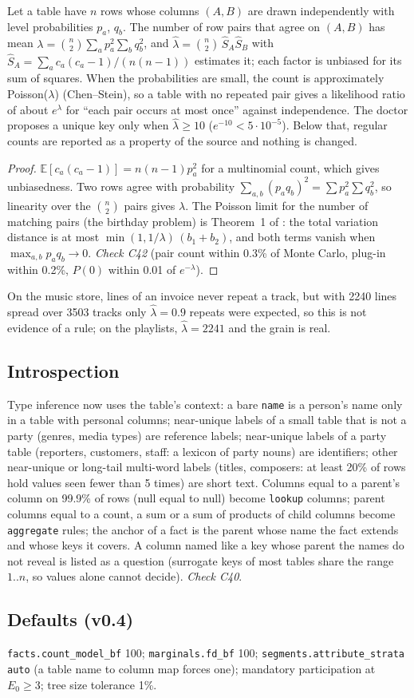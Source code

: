 \begin{proposition}\label{prop:grainev}
Let a table have $n$ rows whose columns $(A,B)$ are drawn independently with level probabilities $p_a$, $q_b$. The number of row pairs that agree on $(A,B)$ has mean $\lambda=\binom n2\sum_a p_a^2\sum_b q_b^2$, and $\hat\lambda=\binom n2\,\hat S_A\hat S_B$ with $\hat S_A=\sum_a c_a(c_a-1)/(n(n-1))$ estimates it; each factor is unbiased for its sum of squares. When the probabilities are small, the count is approximately Poisson($\lambda$) (Chen--Stein), so a table with no repeated pair gives a likelihood ratio of about $e^{\lambda}$ for ``each pair occurs at most once'' against independence. The doctor proposes a unique key only when $\hat\lambda\ge10$ ($e^{-10}<5\cdot10^{-5}$). Below that, regular counts are reported as a property of the source and nothing is changed.
\end{proposition}
\begin{proof}
$\mathbb E[c_a(c_a-1)]=n(n-1)p_a^2$ for a multinomial count, which gives unbiasedness. Two rows agree with probability $\sum_{a,b}(p_aq_b)^2=\sum p_a^2\sum q_b^2$, so linearity over the $\binom n2$ pairs gives $\lambda$. The Poisson limit for the number of matching pairs (the birthday problem) is Theorem~1 of \cite{agg}: the total variation distance is at most $\min(1,1/\lambda)\,(b_1+b_2)$, and both terms vanish when $\max_{a,b}p_aq_b\to0$. \emph{Check C42} (pair count within 0.3\% of Monte Carlo, plug-in within 0.2\%, $P(0)$ within 0.01 of $e^{-\lambda}$).
\end{proof}
On the music store, lines of an invoice never repeat a track, but with 2240 lines spread over 3503 tracks only $\hat\lambda=0.9$ repeats were expected, so this is not evidence of a rule; on the playlists, $\hat\lambda=2241$ and the grain is real.

\subsection{Introspection}
Type inference now uses the table's context: a bare \texttt{name} is a person's name only in a table with personal columns; near-unique labels of a small table that is not a party (genres, media types) are reference labels; near-unique labels of a party table (reporters, customers, staff: a lexicon of party nouns) are identifiers; other near-unique or long-tail multi-word labels (titles, composers: at least 20\% of rows hold values seen fewer than 5 times) are short text. Columns equal to a parent's column on 99.9\% of rows (null equal to null) become \texttt{lookup} columns; parent columns equal to a count, a sum or a sum of products of child columns become \texttt{aggregate} rules; the anchor of a fact is the parent whose name the fact extends and whose keys it covers. A column named like a key whose parent the names do not reveal is listed as a question (surrogate keys of most tables share the range $1..n$, so values alone cannot decide). \emph{Check C40}.

\subsection{Defaults (v0.4)}
\texttt{facts.count\_model\_bf} 100; \texttt{marginals.fd\_bf} 100; \texttt{segments.attribute\_strata} \texttt{auto} (a table name to column map forces one); mandatory participation at $E_0\ge3$; tree size tolerance 1\%.
